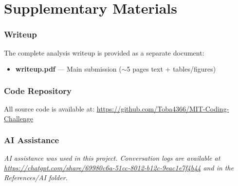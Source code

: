 \documentclass[11pt]{article}
\begin{document}
\clearpage

\part{Supplementary Materials}
\clearpage

\section{Writeup}
The complete analysis writeup is provided as a separate document:

\begin{itemize}
    \item \textbf{writeup.pdf} --- Main submission ($\sim$5 pages text + tables/figures)
\end{itemize}

\section{Code Repository}
All source code is available at:
\url{https://github.com/Toba4366/MIT-Coding-Challenge}

\section{AI Assistance}
\textit{\small AI assistance was used in this project. Conversation logs are available at \url{https://chatgpt.com/share/69980c6a-51cc-8012-b12c-9eac1e7f4b44} and in the References/AI folder.}
\end{document}
